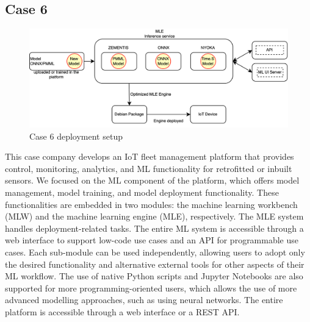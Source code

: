 \subsection*{Case 6} %
\label{case: 6}
\begin{figure}[b]
\centering
\includegraphics[width=\linewidth]{images/case6_deployment_process.png}
\caption{Case 6 deployment setup}
\label{fig: case6_deployment_process}
\end{figure}


This case company develops an IoT fleet management platform that provides control, monitoring, analytics, and ML functionality for retrofitted or inbuilt sensors. We focused on the ML component of the platform, which offers model management, model training, and model deployment functionality. These functionalities are embedded in two modules: the machine learning workbench (MLW) and the machine learning engine (MLE), respectively. The MLE system handles deployment-related tasks. The entire ML system is accessible through a web interface to support low-code use cases and an API for programmable use cases. Each sub-module can be used independently, allowing users to adopt only the desired functionality and alternative external tools for other aspects of their ML workflow. The use of native Python scripts and Jupyter Notebooks are also supported for more programming-oriented users, which allows the use of more advanced modelling approaches, such as using neural networks. The entire platform is accessible through a web interface or a REST API. %

